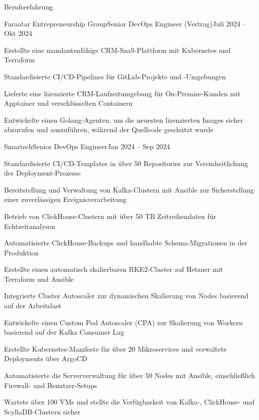 \documentclass[]{main}
\begin{document}
\begin{section}{Berufserfahrung}
 \begin{subsection}{Faraatar Entrepreneurship Group}{Senior DevOps Engineer (Vertrag)}{Juli 2024 -- Okt 2024}{}
     \item Erstellte eine mandantenfähige CRM-SaaS-Plattform mit Kubernetes und Terraform
     \item Standardisierte CI/CD-Pipelines für GitLab-Projekte und -Umgebungen
     \item Lieferte eine lizenzierte CRM-Laufzeitumgebung für On-Premise-Kunden mit Apptainer und verschlüsselten Containern
     \item Entwickelte einen Golang-Agenten, um die neuesten lizenzierten Images sicher abzurufen und auszuführen, während der Quellcode geschützt wurde
 \end{subsection}

 \begin{subsection}{Smartech}{Senior DevOps Engineer}{Jan 2024 -- Sep 2024}{}
     \item Standardisierte CI/CD-Templates in über 50 Repositories zur Vereinheitlichung der Deployment-Prozesse
     \item Bereitstellung und Verwaltung von Kafka-Clustern mit Ansible zur Sicherstellung einer zuverlässigen Ereignisverarbeitung
     \item Betrieb von ClickHouse-Clustern mit über 50 TB Zeitreihendaten für Echtzeitanalysen
     \item Automatisierte ClickHouse-Backups und handhabte Schema-Migrationen in der Produktion
     \item Erstellte einen automatisch skalierbaren RKE2-Cluster auf Hetzner mit Terraform und Ansible
     \item Integrierte Cluster Autoscaler zur dynamischen Skalierung von Nodes basierend auf der Arbeitslast
     \item Entwickelte einen Custom Pod Autoscaler (CPA) zur Skalierung von Workern basierend auf der Kafka Consumer Lag
     \item Erstellte Kubernetes-Manifeste für über 20 Mikroservices und verwaltete Deployments über ArgoCD
     \item Automatisierte die Serververwaltung für über 50 Nodes mit Ansible, einschließlich Firewall- und Benutzer-Setups
     \item Wartete über 100 VMs und stellte die Verfügbarkeit von Kafka-, ClickHouse- und ScyllaDB-Clustern sicher
 \end{subsection}


\end{section}
\end{document}
